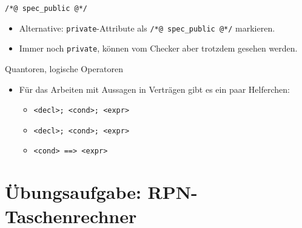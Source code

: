 \documentclass{beamer}
\newcommand{\code}[1]{
	\begin{mdframed}
		
	\end{mdframed}
}
\begin{document}
\begin{frame}{\texttt{/*@ spec_public @*/}}
	\code{code/jml/specpublic.java}

	\begin{itemize}
		\item Alternative: \texttt{private}-Attribute als \texttt{/*@ spec_public @*/} markieren.
		\item Immer noch \texttt{private}, können vom Checker aber trotzdem gesehen werden.
	\end{itemize}
\end{frame}

\begin{frame}{Quantoren, logische Operatoren}
	\code{code/jml/quantors.java}

	\begin{itemize}
		\item Für das Arbeiten mit Aussagen in Verträgen gibt es ein paar Helferchen:
		\begin{itemize}
			\item \texttt{\string\forall <decl>; <cond>; <expr>}
			\item \texttt{\string\exists <decl>; <cond>; <expr>}
			\item \texttt{<cond> ==> <expr>}
		\end{itemize}
	\end{itemize}
\end{frame}

\section{Übungsaufgabe: RPN-Taschenrechner}
\end{document}
